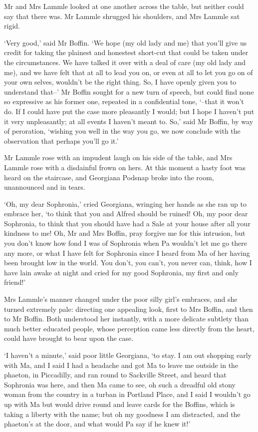 Mr and Mrs Lammle looked at one another across the table, but neither
could say that there was. Mr Lammle shrugged his shoulders, and Mrs
Lammle sat rigid.

‘Very good,’ said Mr Boffin. ‘We hope (my old lady and me) that you’ll
give us credit for taking the plainest and honestest short-cut that
could be taken under the circumstances. We have talked it over with a
deal of care (my old lady and me), and we have felt that at all to lead
you on, or even at all to let you go on of your own selves, wouldn’t be
the right thing. So, I have openly given you to understand that--’
Mr Boffin sought for a new turn of speech, but could find none so
expressive as his former one, repeated in a confidential tone, ‘--that
it won’t do. If I could have put the case more pleasantly I would; but
I hope I haven’t put it very unpleasantly; at all events I haven’t meant
to. So,’ said Mr Boffin, by way of peroration, ‘wishing you well in the
way you go, we now conclude with the observation that perhaps you’ll go
it.’

Mr Lammle rose with an impudent laugh on his side of the table, and Mrs
Lammle rose with a disdainful frown on hers. At this moment a hasty foot
was heard on the staircase, and Georgiana Podsnap broke into the room,
unannounced and in tears.

‘Oh, my dear Sophronia,’ cried Georgiana, wringing her hands as she ran
up to embrace her, ‘to think that you and Alfred should be ruined! Oh,
my poor dear Sophronia, to think that you should have had a Sale at your
house after all your kindness to me! Oh, Mr and Mrs Boffin, pray forgive
me for this intrusion, but you don’t know how fond I was of Sophronia
when Pa wouldn’t let me go there any more, or what I have felt for
Sophronia since I heard from Ma of her having been brought low in the
world. You don’t, you can’t, you never can, think, how I have lain awake
at night and cried for my good Sophronia, my first and only friend!’

Mrs Lammle’s manner changed under the poor silly girl’s embraces, and
she turned extremely pale: directing one appealing look, first to Mrs
Boffin, and then to Mr Boffin. Both understood her instantly, with
a more delicate subtlety than much better educated people, whose
perception came less directly from the heart, could have brought to bear
upon the case.

‘I haven’t a minute,’ said poor little Georgiana, ‘to stay. I am out
shopping early with Ma, and I said I had a headache and got Ma to leave
me outside in the phaeton, in Piccadilly, and ran round to Sackville
Street, and heard that Sophronia was here, and then Ma came to see, oh
such a dreadful old stony woman from the country in a turban in Portland
Place, and I said I wouldn’t go up with Ma but would drive round and
leave cards for the Boffins, which is taking a liberty with the name;
but oh my goodness I am distracted, and the phaeton’s at the door, and
what would Pa say if he knew it!’

